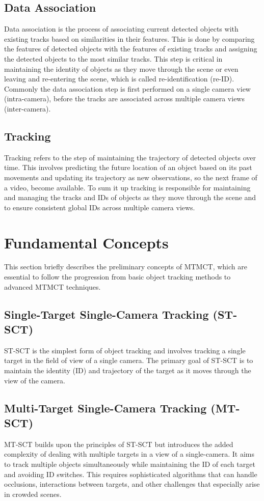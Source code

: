 \subsection{Data Association}\label{subsec:data_association}
Data association is the process of associating current detected objects with existing tracks based on similarities in their features. This is done by comparing the features of detected objects with the features of existing tracks and assigning the detected objects to the most similar tracks. This step is critical in maintaining the identity of objects as they move through the scene or even leaving and re-entering the scene, which is called re-identification (re-ID). Commonly the data association step is first performed on a single camera view (intra-camera), before the tracks are associated across multiple camera views (inter-camera).

\subsection{Tracking}\label{subsec:tracking}
Tracking refers to the step of maintaining the trajectory of detected objects over time. This involves predicting the future location of an object based on its past movements and updating its trajectory as new observations, so the next frame of a video, become available. To sum it up tracking is responsible for maintaining and managing the tracks and IDs of objects as they move through the scene and to ensure consistent global IDs across multiple camera views.

\section{Fundamental Concepts}\label{sec:fundamental_concepts}
This section briefly describes the preliminary concepts of MTMCT, which are essential to follow the progression from basic object tracking methods to advanced MTMCT techniques.

\subsection{Single-Target Single-Camera Tracking (ST-SCT)}\label{subsec:st_sct}
ST-SCT is the simplest form of object tracking and involves tracking a single target in the field of view of a single camera. The primary goal of ST-SCT is to maintain the identity (ID) and trajectory of the target as it moves through the view of the camera.

\subsection{Multi-Target Single-Camera Tracking (MT-SCT)}\label{subsec:mt_sct}
MT-SCT builds upon the principles of ST-SCT but introduces the added complexity of dealing with multiple targets in a view of a single-camera. It aims to track multiple objects simultaneously while maintaining the ID of each target and avoiding ID switches. This requires sophisticated algorithms that can handle occlusions, interactions between targets, and other challenges that especially arise in crowded scenes.


